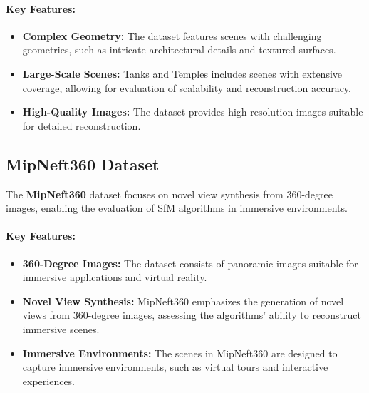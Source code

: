 \paragraph{Key Features:}
\begin{itemize}
    \item \textbf{Complex Geometry:} The dataset features scenes with challenging geometries, such as intricate architectural details and textured surfaces.
    \item \textbf{Large-Scale Scenes:} Tanks and Temples includes scenes with extensive coverage, allowing for evaluation of scalability and reconstruction accuracy.
    \item \textbf{High-Quality Images:} The dataset provides high-resolution images suitable for detailed reconstruction.
\end{itemize}

\subsection{MipNeft360 Dataset}

The \textbf{MipNeft360} dataset \cite{barron2022mipnerf360} focuses on novel view synthesis from 360-degree images, enabling the evaluation of SfM algorithms in immersive environments.

\paragraph{Key Features:}
\begin{itemize}
    \item \textbf{360-Degree Images:} The dataset consists of panoramic images suitable for immersive applications and virtual reality.
    \item \textbf{Novel View Synthesis:} MipNeft360 emphasizes the generation of novel views from 360-degree images, assessing the algorithms' ability to reconstruct immersive scenes.
    \item \textbf{Immersive Environments:} The scenes in MipNeft360 are designed to capture immersive environments, such as virtual tours and interactive experiences.
\end{itemize}